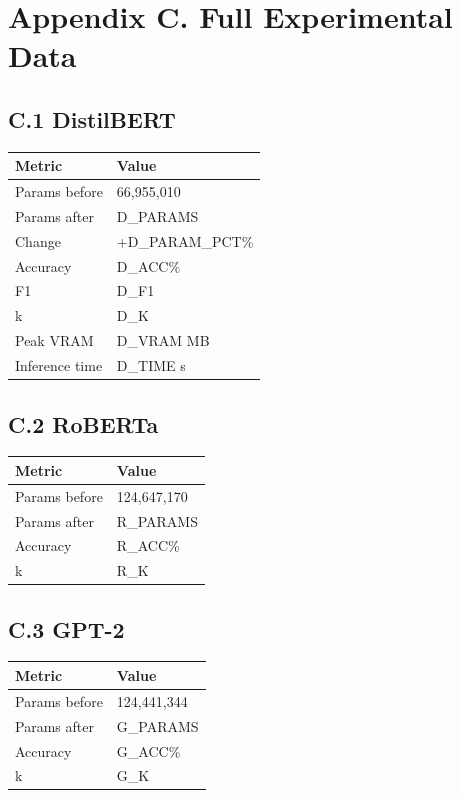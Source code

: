 \section{Appendix C. Full Experimental Data}

\subsection{C.1 DistilBERT}

\begin{table}[H]
\centering
\small
\begin{tabular}{ll}
\toprule
\textbf{Metric} & \textbf{Value} \\
\midrule
Params before & 66,955,010 \\
Params after & {{D\_PARAMS}} \\
Change & +{{D\_PARAM\_PCT}}\% \\
Accuracy & {{D\_ACC}}\% \\
F1 & {{D\_F1}} \\
k & {{D\_K}} \\
Peak VRAM & {{D\_VRAM}} MB \\
Inference time & {{D\_TIME}} s \\
\bottomrule
\end{tabular}
\end{table}

\subsection{C.2 RoBERTa}

\begin{table}[H]
\centering
\small
\begin{tabular}{ll}
\toprule
\textbf{Metric} & \textbf{Value} \\
\midrule
Params before & 124,647,170 \\
Params after & {{R\_PARAMS}} \\
Accuracy & {{R\_ACC}}\% \\
k & {{R\_K}} \\
\bottomrule
\end{tabular}
\end{table}

\subsection{C.3 GPT-2}

\begin{table}[H]
\centering
\small
\begin{tabular}{ll}
\toprule
\textbf{Metric} & \textbf{Value} \\
\midrule
Params before & 124,441,344 \\
Params after & {{G\_PARAMS}} \\
Accuracy & {{G\_ACC}}\% \\
k & {{G\_K}} \\
\bottomrule
\end{tabular}
\end{table}

